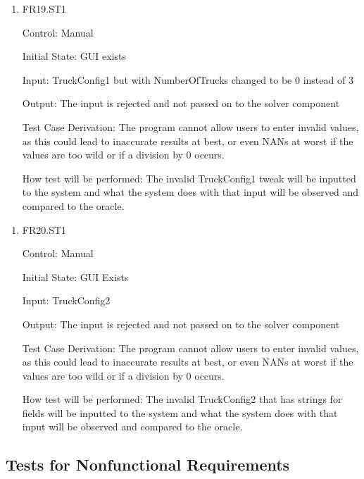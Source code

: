 \documentclass[12pt, titlepage]{article}
\begin{document}
\begin{enumerate}

  \item{FR19.ST1\\}
  
  Control: Manual
            
  Initial State: GUI exists
            
  Input: TruckConfig1 but with NumberOfTrucks changed to be 0 instead of 3
            
  Output: The input is rejected and not passed on to the solver component

  Test Case Derivation: The program cannot allow users to enter invalid values, as this could lead to inaccurate results at best, or even NANs at worst if the values are too wild or if a division by 0 occurs.
  
  How test will be performed: The invalid TruckConfig1 tweak will be inputted to the system and what the system does with that input will be observed and compared to the oracle.
                
\end{enumerate}
\begin{enumerate}

  \item{FR20.ST1\\}
  
  Control: Manual
            
  Initial State: GUI Exists
            
  Input: TruckConfig2
            
  Output: The input is rejected and not passed on to the solver component
  
  Test Case Derivation: The program cannot allow users to enter invalid values, as this could lead to inaccurate results at best, or even NANs at worst if the values are too wild or if a division by 0 occurs.
  
  How test will be performed: The invalid TruckConfig2 that has strings for fields will be inputted to the system and what the system does with that input will be observed and compared to the oracle.
                  
\end{enumerate}

\subsection{Tests for Nonfunctional Requirements}
\end{document}
